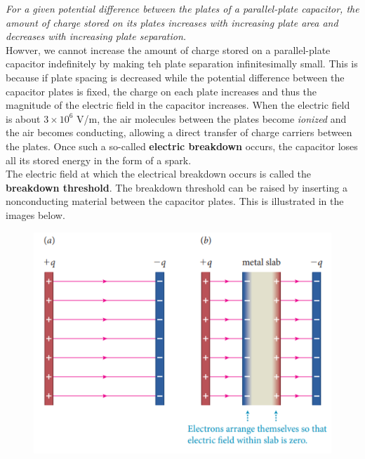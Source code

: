         \textit{For a given potential difference between the plates of a parallel-plate capacitor, the amount of charge stored on its plates increases with increasing plate area and decreases with increasing plate
        separation.} \\

        Howver, we cannot increase the amount of charge stored on a parallel-plate capacitor indefinitely by making teh plate separation infinitesimally small. This is because if plate spacing is decreased while the
        potential difference between the capacitor plates is fixed, the charge on each plate increases and thus the magnitude of the electric field in the capacitor increases. When the electric field is about
        $3 \times 10^6$ V/m, the air molecules between the plates become \textit{ionized} and the air becomes conducting, allowing a direct transfer of charge carriers between the plates. Once such a so-called
        \textbf{electric breakdown} occurs, the capacitor loses all its stored energy in the form of a spark. \\

        The electric field at which the electrical breakdown occurs is called the \textbf{breakdown threshold}. The breakdown threshold can be raised by inserting a nonconducting material between the capacitor plates.
        This is illustrated in the images below.

        \begin{figure}[hbt!]
            \centering
            \includegraphics[scale = 0.75]{Resources/26.2_Metal_Slab}
        \end{figure}

